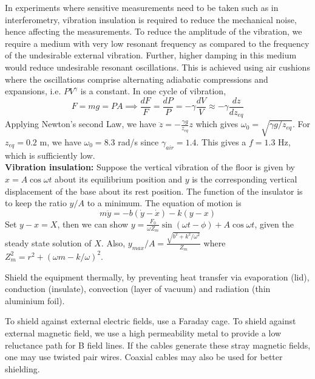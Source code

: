 \documentclass[a4paper]{article}
\begin{document}
\begin{Note} In experiments where sensitive measurements need to be taken such as in interferometry, vibration insulation is required to reduce the mechanical noise, hence affecting the measurements. To reduce the amplitude of the vibration, we require a medium with very low resonant frequency as compared to the frequency of the undesirable external vibration. Further, higher damping in this medium would reduce undesirable resonant oscillations. This is achieved using air cushions where the oscillations comprise alternating adiabatic compressions and expansions, i.e. $PV^\gamma$ is a constant. In one cycle of vibration,
$$F=mg=PA\implies\frac{dF}{F}=\frac{dP}{P}=-\gamma\frac{dV}{V}\approx-\gamma\frac{dz}{dz_{eq}}$$
Applying Newton's second Law, we have $\ddot{z}=-\frac{\gamma g}{z_{eq}}z$ which gives $\omega_0=\sqrt{\gamma g/z_{eq}}$. For $z_{eq}=0.2$ m, we have $\omega_0=8.3$ rad/s since $\gamma_{air}=1.4$. This gives a $f=1.3$ Hz, which is sufficiently low.\\[5pt]
\textbf{Vibration insulation:} Suppose the vertical vibration of the floor is given by $x=A\cos\omega t$ about its equilibrium position and $y$ is the corresponding vertical displacement of the base about its rest position. The function of the insulator is to keep the ratio $y/A$ to a minimum. The equation of motion is
$$m\ddot{y}=-b(\dot{y}-\dot{x})-k(y-x)$$
Set $y-x=X$, then we can show $y=\frac{F_0}{\omega Z_m}\sin(\omega t-\phi)+A\cos\omega t$, given the steady state solution of $X$. Also, $y_{max}/A=\frac{\sqrt{b^2+k^2/\omega^2}}{Z_m}$ where $Z_m^2=r^2+(\omega m-k/\omega)^2$. 
\end{Note}
\begin{Note}
Shield the equipment thermally, by preventing heat transfer via evaporation (lid), conduction (insulate), convection (layer of vacuum) and radiation (thin aluminium foil). 
\end{Note}
\begin{Note}
To shield against external electric fields, use a Faraday cage. To shield against external magnetic field, we use a high permeability metal to provide a low reluctance path for B field lines. If the cables generate these stray magnetic fields, one may use twisted pair wires. Coaxial cables may also be used for better shielding.
\end{Note}
\end{document}
